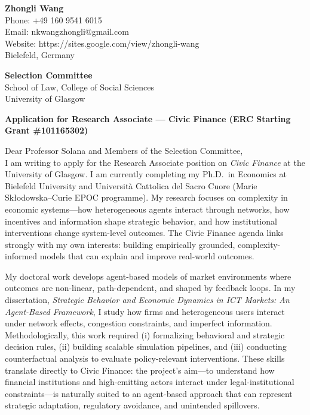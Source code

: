 \documentclass[11pt]{article}
\begin{document}
\noindent
\textbf{Zhongli Wang} \\
Phone: +49 160 9541 6015 \\
Email: nkwangzhongli@gmail.com \\
Website: https://sites.google.com/view/zhongli-wang \\
Bielefeld, Germany \\

\vspace{0.45cm}

\noindent
\textbf{Selection Committee} \\
School of Law, College of Social Sciences \\
University of Glasgow \\

\vspace{0.45cm}

\noindent
\textbf{Application for Research Associate --- Civic Finance (ERC Starting Grant \#101165302)}\\

\vspace{0.25cm}

\noindent Dear Professor Solana and Members of the Selection Committee,\\[0.15cm]

I am writing to apply for the Research Associate position on \emph{Civic Finance} at the University of Glasgow. I am currently completing my Ph.D.\ in Economics at Bielefeld University and Universit\`a Cattolica del Sacro Cuore (Marie Sk{\l}odowska--Curie EPOC programme). My research focuses on complexity in economic systems---how heterogeneous agents interact through networks, how incentives and information shape strategic behavior, and how institutional interventions change system-level outcomes. The Civic Finance agenda links strongly with my own interests: building empirically grounded, complexity-informed models that can explain and improve real-world outcomes.

My doctoral work develops agent-based models of market environments where outcomes are non-linear, path-dependent, and shaped by feedback loops. In my dissertation, \emph{Strategic Behavior and Economic Dynamics in ICT Markets: An Agent-Based Framework}, I study how firms and heterogeneous users interact under network effects, congestion constraints, and imperfect information. Methodologically, this work required (i) formalizing behavioral and strategic decision rules, (ii) building scalable simulation pipelines, and (iii) conducting counterfactual analysis to evaluate policy-relevant interventions. These skills translate directly to Civic Finance: the project’s aim---to understand how financial institutions and high-emitting actors interact under legal-institutional constraints---is naturally suited to an agent-based approach that can represent strategic adaptation, regulatory avoidance, and unintended spillovers.
\end{document}
